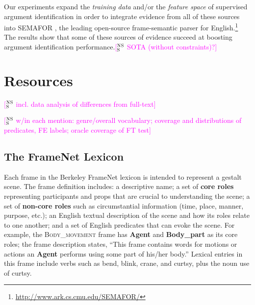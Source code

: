 \documentclass[11pt,a4paper]{article}
\newcommand{\ensuretext}[1]{#1}
\newcommand{\nssmarker}{\ensuretext{\textcolor{magenta}{\ensuremath{^{\textsc{NS}}_{\textsc{S}}}}}}
\newcommand{\arkcomment}[3]{\ensuretext{\textcolor{#3}{[#1 #2]}}}
\newcommand{\nss}[1]{\arkcomment{\nssmarker}{#1}{magenta}}
\newcommand{\fnf}[1]{\textsc{\textsf{#1}}} %
\newcommand{\fnr}[1]{\textbf{\textsf{#1}}} %
\newcommand{\fnlu}[1]{\textsf{#1}} %
\begin{document}
Our experiments expand the \emph{training data} and/or the \emph{feature space}
of supervised argument identification
in order to integrate evidence from all of these sources 
into SEMAFOR \citep{das-14}, the leading open-source frame-semantic parser for English.\footnote{\url{http://www.ark.cs.cmu.edu/SEMAFOR/}} 
The results show that some of these sources of evidence succeed 
at boosting argument identification performance.\nss{SOTA (without constraints)?}


\section{Resources}

\nss{incl. data analysis of differences from full-text}

\nss{w/in each mention: genre/overall vocabulary; coverage and distributions of predicates, FE labels; oracle coverage of FT test}

\subsection{The FrameNet Lexicon}\label{sec:lex}

Each frame in the Berkeley FrameNet lexicon is intended to represent a gestalt scene. 
The frame definition includes: a descriptive name; 
a set of \textbf{core roles} representing participants and props that are crucial 
to understanding the scene; a set of \textbf{non-core roles} such as circumstantial 
information (time, place, manner, purpose, etc.); 
an English textual description of the scene and how its roles relate to one another;
and a set of English predicates that can evoke the scene.
For example, the \fnf{Body\_movement} frame has \fnr{Agent} and \fnr{Body\_part} as its core roles; 
the frame description states,
``This frame contains words for motions or actions an \fnr{Agent} performs using some part of his/her body.''
Lexical entries in this frame include verbs such as \fnlu{bend}, \fnlu{blink}, \fnlu{crane}, and \fnlu{curtsy}, 
plus the noun use of \fnlu{curtsy}.
\end{document}

